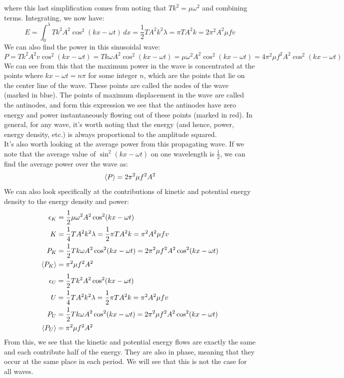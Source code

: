 where this last simplification comes from noting that $Tk^2 = \mu \omega^2$ and combining terms. Integrating, we now have: 
\[
	E = \int_0^\lambda Tk^2 A^2 \cos^2 (kx-\omega t) \, dx = \frac{1}{2} TA^2k^2 \lambda = \pi TA^2 k = 2\pi^2 A^2 \mu f v 
\]
We can also find the power in this sinusoidal wave: 
\[
	P = Tk^2 A^2v \cos^2 (kx-\omega t) = T k \omega A^2 \cos^2 (kx - \omega t) = \mu \omega^2 A^2 \cos^2 (kx - \omega t) = 4\pi^2 \mu f^2 A^2 \cos^2 (kx - \omega t) 
\]
We can see from this that the maximum power in the wave is concentrated at the points where $kx - \omega t = n \pi$ for some integer $n$, which are the points that lie on the center line of the wave. These points are called the nodes of the wave (marked in blue). The points of maximum displacement in the wave are called the antinodes, and form this expression we see that the antinodes have zero energy and power instantaneously flowing out of these points (marked in red). In general, for any wave, it's worth noting that the energy (and hence, power, energy density, etc.) is always proportional to the amplitude squared. \\
It's also worth looking at the average power from this propagating wave. If we note that the average value of $\sin^2 (kx-\omega t)$ on one wavelength is $\frac{1}{2}$, we can find the average power over the wave as: 
\[
	\left\langle P \right\rangle = 2\pi^2 \mu f^2 A^2
\]
We can also look specifically at the contributions of kinetic and potential energy density to the energy density and power: 
\begin{align*}
\epsilon_K &= \frac{1}{2} \mu \omega^2 A^2 \cos^2 (kx - \omega t)\\
K &= \frac{1}{4} TA^2k^2 \lambda = \frac{1}{2} \pi TA^2 k = \pi^2 A^2 \mu f v  \\
P_K &= \frac{1}{2} T k \omega A^2 \cos^2 (kx - \omega t) = 2\pi^2 \mu f^2 A^2 \cos^2 (kx - \omega t) \\
\left\langle P_K \right\rangle &= \pi^2 \mu f^2 A^2 
\end{align*}
\begin{align*}
\epsilon_U &= \frac{1}{2} T k^2 A^2 \cos^2 (kx - \omega t)\\
U &= \frac{1}{4} TA^2k^2 \lambda = \frac{1}{2} \pi TA^2 k = \pi^2 A^2 \mu f v  \\
P_U &= \frac{1}{2} T k \omega A^2 \cos^2 (kx - \omega t) = 2\pi^2 \mu f^2 A^2 \cos^2 (kx - \omega t) \\
\left\langle P_U \right\rangle &= \pi^2 \mu f^2 A^2 
\end{align*}
From this, we see that the kinetic and potential energy flows are exactly the same and each contribute half of the energy. They are also in phase, meaning that they occur at the same place in each period. We will see that this is not the case for all waves. 
